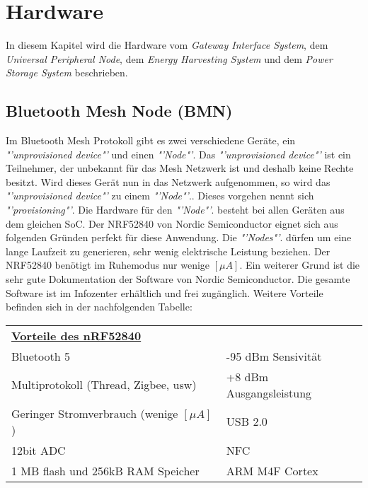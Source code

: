 \clearpage
\section{Hardware}\label{sec:Hardware}
In diesem Kapitel wird die Hardware vom \textit{Gateway Interface System}, dem \textit{Universal Peripheral Node}, dem \textit{Energy Harvesting System} und dem \textit{Power Storage System} beschrieben. 


\subsection{Bluetooth Mesh Node (BMN)}\label{subsec:BMN}
Im Bluetooth Mesh Protokoll gibt es zwei verschiedene  Geräte, ein \textit{"'unprovisioned device"'} und einen \textit{"'Node"'}. Das \textit{"'unprovisioned device"'}  ist ein Teilnehmer, der unbekannt für das Mesh Netzwerk ist und deshalb keine Rechte besitzt. Wird dieses Gerät nun in das Netzwerk aufgenommen, so wird das \textit{"'unprovisioned device"'}  zu einem \textit{"'Node"'}.. Dieses vorgehen nennt sich \textit{"'provisioning"'}. Die Hardware für den \textit{"'Node"'}. besteht bei allen Geräten aus dem gleichen SoC. Der NRF52840 von Nordic Semiconductor eignet sich aus folgenden Gründen perfekt für diese Anwendung. Die \textit{"'Nodes"'}. dürfen um eine lange Laufzeit zu generieren, sehr wenig elektrische Leistung beziehen. Der NRF52840 benötigt im Ruhemodus nur wenige $[\mu A]$. Ein weiterer Grund ist die sehr gute Dokumentation der Software von Nordic Semiconductor. Die gesamte Software ist im Infozenter erhältlich und frei zugänglich. Weitere Vorteile befinden sich in der nachfolgenden Tabelle:


\begin{table}[h]
	\begin{tabular}{ll}
		\multicolumn{2}{l}{{\ul \textbf{Vorteile des nRF52840}}}       \\
		Bluetooth 5                          											   & -95 dBm Sensivität      \\
		Multiprotokoll (Thread, Zigbee, usw) 						   & +8 dBm Ausgangsleistung \\
		Geringer Stromverbrauch  (wenige $[\mu A]$)      	& USB 2.0                 \\
		12bit ADC                            												& NFC                     \\
		1 MB flash und 256kB RAM Speicher    						& ARM M4F Cortex         
	\end{tabular}
\end{table}


